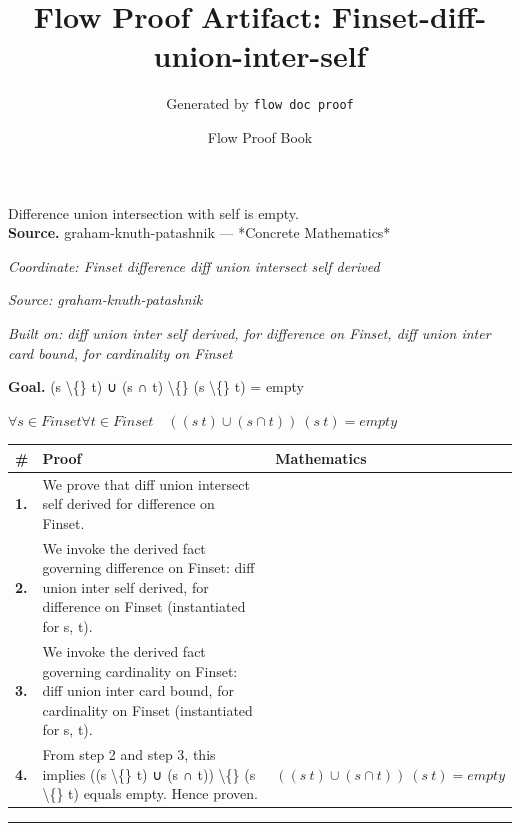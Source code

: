 \documentclass[11pt]{article}
\title{Flow Proof Artifact: Finset-diff-union-inter-self}
\author{Generated by \texttt{flow doc proof}}
\date{Flow Proof Book}
\theoremstyle{definition}
\begin{document}
\maketitle
Difference union intersection with self is empty.\\[0.5em]
\textbf{Source.} graham-knuth-patashnik — *Concrete Mathematics*\\[0.5em]
\bigskip
{}\par
\smallskip\noindent\textit{Coordinate: Finset \cdot difference \cdot diff union intersect self derived}\par
\smallskip\noindent\textit{Source: graham-knuth-patashnik}\par
\smallskip\noindent\textit{Built on: diff union inter self derived, for difference on Finset, diff union inter card bound, for cardinality on Finset}\par
\medskip
\noindent\textbf{Goal.} (s \textbackslash\{\} t) ∪ (s ∩ t) \textbackslash\{\} (s \textbackslash\{\} t) = empty\par
\noindent$\displaystyle \forall s \in Finset \forall t \in Finset\quad ((s \ t) ∪ (s ∩ t)) \ (s \ t) = empty$\par
\medskip
\noindent
\begin{tabular}{@{} >{\raggedright\arraybackslash}p{} >{\raggedright\arraybackslash}p{} >{\raggedleft\arraybackslash}p{} @{}}
\textbf{\#} & \textbf{Proof} & \textbf{Mathematics} \\
\midrule
\textbf{1.} & We prove that diff union intersect self derived for difference on Finset. & \\[0.45em]
\textbf{2.} & We invoke the derived fact governing difference on Finset: diff union inter self derived, for difference on Finset (instantiated for s, t). & \\[0.45em]
\textbf{3.} & We invoke the derived fact governing cardinality on Finset: diff union inter card bound, for cardinality on Finset (instantiated for s, t). & \\[0.45em]
\textbf{4.} & From step 2 and step 3, this implies ((s \textbackslash\{\} t) ∪ (s ∩ t)) \textbackslash\{\} (s \textbackslash\{\} t) equals empty. Hence proven. & $\displaystyle ((s \ t) ∪ (s ∩ t)) \ (s \ t) = empty$ \\[0.45em]
\bottomrule
\end{tabular}
\label{thm:Finset-difference-diff_union_intersect_self_derived}
\par\medskip\hrule
\end{document}
